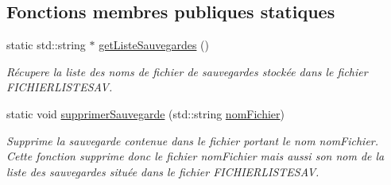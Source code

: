 \subsection*{Fonctions membres publiques statiques}
\begin{DoxyCompactItemize}
\item 
static std\+::string $\ast$ \hyperlink{class_gestion_sauvegarde_a9f45d946956c7e9624a3c81c55f7c7bd}{get\+Liste\+Sauvegardes} ()
\begin{DoxyCompactList}\small\item\em Récupere la liste des noms de fichier de sauvegardes stockée dans le fichier F\+I\+C\+H\+I\+E\+R\+L\+I\+S\+T\+E\+S\+AV. \end{DoxyCompactList}\item 
static void \hyperlink{class_gestion_sauvegarde_a7e17e827e1718123008c76c232c38e98}{supprimer\+Sauvegarde} (std\+::string \hyperlink{class_gestion_sauvegarde_afda944907acb4f5660cda5a893a8fb66}{nom\+Fichier})
\begin{DoxyCompactList}\small\item\em Supprime la sauvegarde contenue dans le fichier portant le nom {\ttfamily nom\+Fichier}. Cette fonction supprime donc le fichier {\ttfamily nom\+Fichier} mais aussi son nom de la liste des sauvegardes située dans le fichier F\+I\+C\+H\+I\+E\+R\+L\+I\+S\+T\+E\+S\+AV. \end{DoxyCompactList}\end{DoxyCompactItemize}
